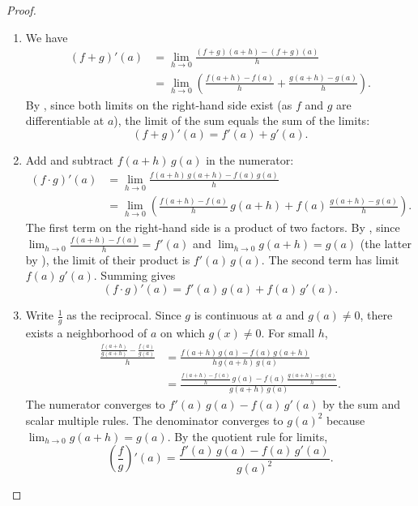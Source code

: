 \begin{proof}
    \begin{enumerate}
        \item We have
            \begin{align*}
                (f+g)'(a) &= \lim_{h \to 0} \frac{(f+g)(a+h) - (f+g)(a)}{h} \\
                &= \lim_{h \to 0} \left( \frac{f(a+h) - f(a)}{h} + \frac{g(a+h) - g(a)}{h} \right).
            \end{align*}
            By , since both limits on the right-hand side exist (as $f$ and $g$ are differentiable at $a$), the limit of the sum equals the sum of the limits:
            $$(f+g)'(a) = f'(a) + g'(a).$$

        \item Add and subtract $f(a+h)\,g(a)$ in the numerator:
            \begin{align*}
                (f\cdot g)'(a) &= \lim_{h \to 0} \frac{f(a+h)\,g(a+h) - f(a)\,g(a)}{h} \\
                &= \lim_{h \to 0} \left( \frac{f(a+h) - f(a)}{h}\,g(a+h) + f(a)\,\frac{g(a+h) - g(a)}{h} \right).
            \end{align*}
            The first term on the right-hand side is a product of two factors. By , since $\lim_{h \to 0} \frac{f(a+h) - f(a)}{h} = f'(a)$ and $\lim_{h \to 0} g(a+h) = g(a)$ (the latter by ), the limit of their product is $f'(a)\,g(a)$. The second term has limit $f(a)\,g'(a)$. Summing gives
            $$(f\cdot g)'(a) = f'(a)\,g(a) + f(a)\,g'(a).$$

        \item Write $\frac{1}{g}$ as the reciprocal. Since $g$ is continuous at $a$ and $g(a) \neq 0$, there exists a neighborhood of $a$ on which $g(x) \neq 0$. For small $h$,
            \begin{align*}
                \frac{\frac{f(a+h)}{g(a+h)} - \frac{f(a)}{g(a)}}{h} &= \frac{f(a+h)\,g(a) - f(a)\,g(a+h)}{h\,g(a+h)\,g(a)} \\
                &= \frac{\frac{f(a+h) - f(a)}{h}\,g(a) - f(a)\,\frac{g(a+h) - g(a)}{h}}{g(a+h)\,g(a)}.
            \end{align*}
            The numerator converges to $f'(a)\,g(a) - f(a)\,g'(a)$ by the sum and scalar multiple rules. The denominator converges to $g(a)^2$ because $\lim_{h \to 0} g(a+h) = g(a)$. By the quotient rule for limits,
            $$\left(\frac{f}{g}\right)'(a) = \frac{f'(a)\,g(a) - f(a)\,g'(a)}{g(a)^2}.$$


\end{enumerate}
\end{proof}
